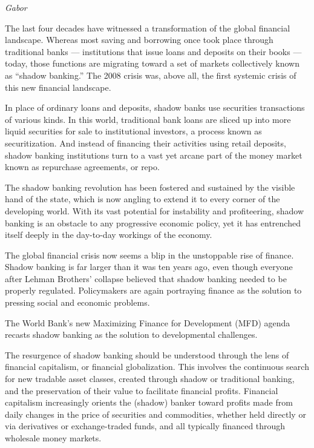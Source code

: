 \documentclass[
]{book}
\begin{document}
\emph{Gabor}

The last four decades have witnessed a transformation of the global financial landscape. Whereas most saving and borrowing once took place through traditional banks --- institutions that issue loans and deposits on their books --- today, those functions are migrating toward a set of markets collectively known as ``shadow banking.'' The 2008 crisis was, above all, the first systemic crisis of this new financial landscape.

In place of ordinary loans and deposits, shadow banks use securities transactions of various kinds. In this world, traditional bank loans are sliced up into more liquid securities for sale to institutional investors, a process known as securitization. And instead of financing their activities using retail deposits, shadow banking institutions turn to a vast yet arcane part of the money market known as repurchase agreements, or repo.

The shadow banking revolution has been fostered and sustained by the visible hand of the state, which is now angling to extend it to every corner of the developing world. With its vast potential for instability and profiteering, shadow banking is an obstacle to any progressive economic policy, yet it has entrenched itself deeply in the day-to-day workings of the economy.

The global financial crisis now seems a blip in the unstoppable rise of finance. Shadow banking is far larger than it was ten years ago, even though everyone after Lehman Brothers' collapse believed that shadow banking needed to be properly regulated. Policymakers are again portraying finance as the solution to pressing social and economic problems.

The World Bank's new Maximizing Finance for Development (MFD) agenda recasts shadow banking as the solution to developmental challenges.

The resurgence of shadow banking should be understood through the lens of financial capitalism, or financial globalization. This involves the continuous search for new tradable asset classes, created through shadow or traditional banking, and the preservation of their value to facilitate financial profits. Financial capitalism increasingly orients the (shadow) banker toward profits made from daily changes in the price of securities and commodities, whether held directly or via derivatives or exchange-traded funds, and all typically financed through wholesale money markets.
\end{document}
